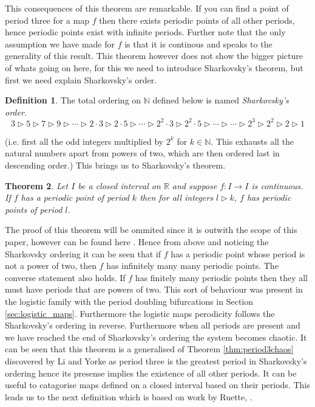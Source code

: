 \documentclass[11pt,a4paper,oneside]{memoir}
\theoremstyle{plain}
\newtheorem{thm}{Theorem}[chapter]
\theoremstyle{definition}
\newtheorem{defn}[thm]{Definition}
\begin{document}
This consequences of this theorem are remarkable. If you can find a point of period three for a map $f$ then there exists periodic points of all other periods, hence periodic points exist with infinite periods. Further note that the only assumption we have made for $f$ is that it is continous and speaks to the generality of this result. This theorem however does not show the bigger picture of whats going on here, for this we need to introduce Sharkovsky's theorem, but first we need explain Sharkovsky's order.

\begin{defn}
    The total ordering on $\mathbb{N}$ defined below is named \emph{Sharkovsky's order}. \[ 3 \rhd 5 \rhd 7 \rhd 9 \rhd \cdots \rhd 2 \cdot 3 \rhd 2 \cdot 5 \rhd \cdots \rhd 2^2 \cdot 3 \rhd 2^2 \cdot 5 \rhd \cdots \rhd \cdots \rhd 2^3 \rhd 2^2 \rhd 2 \rhd 1 \]
\end{defn}
(i.e. first all the odd integers multiplied by $2^k$ for $k \in \mathbb{N}$. This exhausts all the natural numbers apart from powers of two, which are then ordered last in descending order.) This brings us to Sharkovsky's theorem.

\begin{thm}
    Let $I$ be a closed interval on $\mathbb{R}$ and suppose $f: I \to I$ is continuous. If $f$ has a periodic point of period $k$ then for all integers $l \rhd k$, $f$ has periodic points of period $l$.
\end{thm}

The proof of this theorem will be ommited since it is outwith the scope of this paper, however can be found here \cite{sharkovsky}. Hence from above and noticing the Sharkovsky ordering it can be seen that if $f$ has a periodic point whose period is not a power of two, then $f$ has infinitely many many periodic points. The converse statement also holds. If $f$ has finitely many periodic points then they all must have periods that are powers of two. This sort of behaviour was present in the logistic family with the period doubling bifurcations in Section \ref{sec:logistic_maps}. Furthermore the logistic maps perodicity follows the Sharkovsky's ordering in reverse. Furthermore when all periods are present and we have reached the end of Sharkovsky's ordering the system becomes chaotic. It can be seen that this theorem is a generalised of Theorem \ref{thm:period3chaos} discovered by Li and Yorke \cite{li-yorke} as period three is the greatest period in Sharkovsky's ordering hence its presense implies the existence of all other periods. It can be useful to catagorise maps defined on a closed interval based on their periods. This leads us to the next definition which is based on work by Ruette, \cite[Section 3.3]{ruette}.
\end{document}
